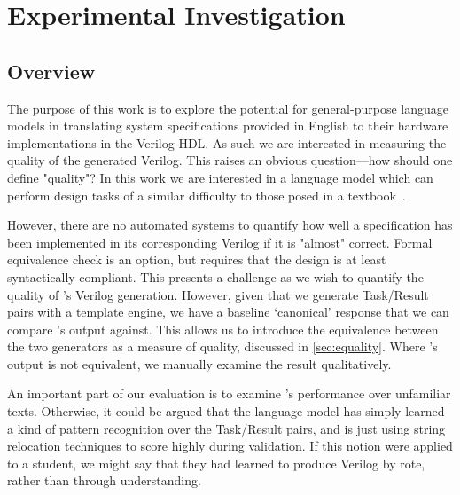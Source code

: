 \section{Experimental Investigation}
\label{sec:results}

\subsection{Overview}
\label{sec:res-overview}
The purpose of this work is to explore the potential for general-purpose language models in translating system specifications provided in English to their hardware implementations in the Verilog \ac{HDL}.
As such we are interested in measuring the quality of the generated Verilog.
This raises an obvious question---how should one define "quality"? 
In this work we are interested in a language model which can perform design tasks of a similar difficulty to those posed in a textbook~\cite{vahid_digital_2010}.

However, there are no automated systems to quantify how well a specification has been implemented in its corresponding Verilog if it is "almost" correct. 
Formal equivalence check is an option, but requires that the design is at least syntactically compliant. 
This presents a challenge as we wish to quantify the quality of \sol's Verilog generation. 
However, given that we generate Task/Result pairs with a template engine, we have a baseline `canonical' response that we can compare \sol's output against.
This allows us to introduce the equivalence between the two generators as a measure of quality, discussed in \autoref{sec:equality}. 
Where \sol's output is not equivalent, we manually examine the result qualitatively. 

An important part of our evaluation is to examine \sol's performance over unfamiliar texts.
Otherwise, it could be argued that the language model has simply learned a kind of pattern recognition over the Task/Result pairs, and is just using string relocation techniques to score highly during validation.
If this notion were applied to a student, we might say that they had learned to produce Verilog by rote, rather than through understanding. 


